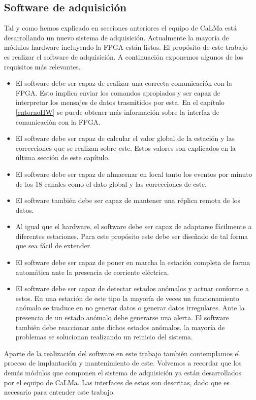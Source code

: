 	\subsection{Software de adquisición}
		Tal y como hemos explicado en secciones anteriores el equipo de CaLMa está desarrollando un nuevo sistema de adquisición. Actualmente
		la mayoría de módulos hardware incluyendo la FPGA están listos. El propósito de este trabajo es realizar el software de adquisición. A
		continuación exponemos algunos de los requisitos más relevantes.
		\begin{itemize}
			\item 	El software debe ser capaz de realizar una correcta comunicación con la FPGA. Esto implica enviar los comandos
				apropiados y ser capaz de interpretar los mensajes de datos trasmitidos por esta. En el capítulo \ref{entornoHW} se
				puede obtener más información sobre la interfaz de comunicación con la FPGA.
			\item 	El software debe ser capaz de calcular el valor global de la estación y las correcciones que se realizan sobre este.
			  	Estos valores son explicados en la última sección de este capítulo.
			\item	El software debe ser capaz de almacenar en local tanto los eventos por minuto de los 18 canales como el dato global y
			  	las correcciones de este.
			\item 	El software también debe ser capaz de mantener una réplica remota de los datos.
			\item 	Al igual que el hardware, el software debe ser capaz de adaptarse fácilmente a diferentes estaciones. Para este
				propósito este debe ser diseñado de tal forma que sea fácil de extender.
			\item 	El software debe ser capaz de poner en marcha la estación completa de forma automática ante la presencia de corriente
			  	eléctrica. 
			\item 	El software debe ser capaz de detectar estados anómalos y actuar conforme a estos. En una estación de este tipo la
				mayoría de veces un funcionamiento anómalo se traduce en no generar datos o generar datos irregulares. Ante la
				presencia de un estado anómalo debe generarse una alerta. El software también debe reaccionar ante dichos estados
				anómalos, la mayoría de problemas se solucionan realizando un reinicio del sistema.
		\end{itemize}
		Aparte de la realización del software en este trabajo también contemplamos el proceso de implantación y mantenimiento de este.
		Volvemos a recordar que los demás módulos que componen el sistema de adquisición ya están desarrollados por el equipo de CaLMa. Las
		interfaces de estos son descritas, dado que es necesario para entender este trabajo.
